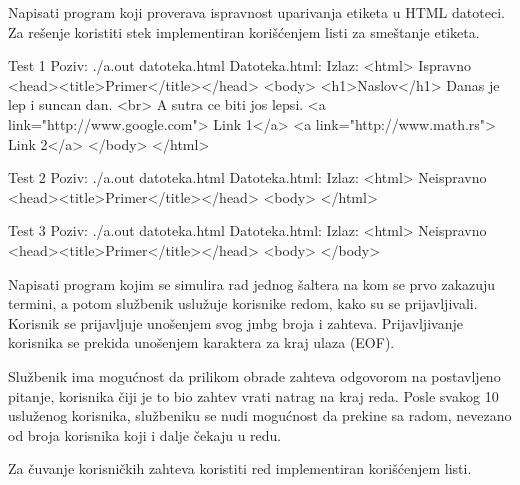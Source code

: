 \begin{Exercise}[label=604]
Napisati program koji proverava ispravnost uparivanja etiketa u HTML datoteci. 
Za rešenje koristiti stek implementiran korišćenjem listi za smeštanje etiketa.


\begin{maxitest}
    \begin{test}{Test 1}
Poziv: ./a.out datoteka.html
Datoteka.html:                                     Izlaz:
<html>                                             Ispravno
  <head><title>Primer</title></head>               
  <body>                                           
    <h1>Naslov</h1>                                
    Danas je lep i suncan dan. <br>                
    A sutra ce biti jos lepsi.     
    <a link="http://www.google.com"> Link 1</a>    
    <a link="http://www.math.rs"> Link 2</a>
  </body>
</html>
    \end{test}
    
  \begin{test}{Test 2}
Poziv: ./a.out datoteka.html
Datoteka.html:                                     Izlaz:
<html>                                             Neispravno
  <head><title>Primer</title></head>               
  <body>  
</html>
  \end{test}
  
  \begin{test}{Test 3}
Poziv: ./a.out datoteka.html
Datoteka.html:                                     Izlaz:
<html>                                             Neispravno
  <head><title>Primer</title></head>               
  <body>  
  </body>
  \end{test}
  
\end{maxitest}

\end{Exercise}
\begin{Answer}[ref=604]
\end{Answer}


\begin{Exercise}[label=605]
Napisati program kojim se simulira rad jednog šaltera na kom se prvo zakazuju 
termini, a potom službenik uslužuje korisnike redom, kako su se prijavljivali.
Korisnik se prijavljuje unošenjem svog jmbg broja i zahteva. Prijavljivanje korisnika se prekida unošenjem karaktera za kraj ulaza (EOF).

Službenik ima mogućnost da prilikom obrade zahteva odgovorom  na 
postavljeno pitanje, korisnika čiji je to bio zahtev vrati natrag na kraj reda.
Posle svakog 10 usluženog korisnika, službeniku se nudi mogućnost da prekine sa 
radom, nevezano od broja korisnika koji i dalje čekaju u redu.

Za čuvanje korisničkih zahteva koristiti red implementiran korišćenjem listi.
\end{Exercise}
\begin{Answer}[ref=605]
\end{Answer}


